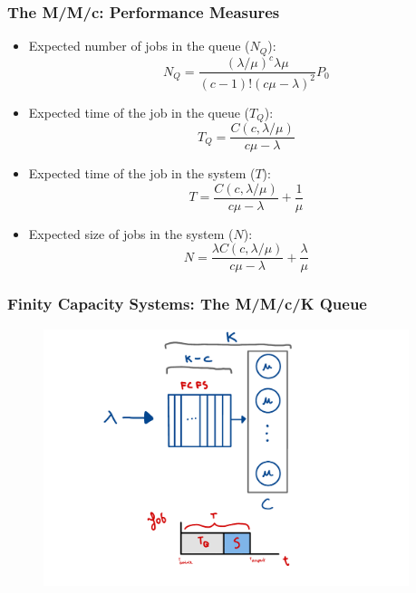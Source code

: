 \begin{frame}
    \frametitle{The M/M/c: Performance Measures}
    \begin{itemize}
        \item Expected number of jobs in the queue ($N_Q$):
        $$N_Q = \frac{(\lambda/\mu)^c\lambda\mu}{(c-1)!(c\mu - \lambda)^2}P_0$$
        \item Expected time of the job in the queue ($T_Q$):
        $$T_Q = \frac{C(c,\lambda/\mu)}{c\mu - \lambda}$$
        \item Expected time of the job in the system ($T$):
        $$T = \frac{C(c,\lambda/\mu)}{c\mu-\lambda} + \frac{1}{\mu}$$
        \item Expected size of jobs in the system ($N$):
        $$N = \frac{\lambda C(c, \lambda/\mu)}{c\mu-\lambda} + \frac{\lambda}{\mu}$$
    \end{itemize}
\end{frame}




\begin{frame}
    \frametitle{Finity Capacity Systems: The M/M/c/K Queue}
    \begin{figure}
        \centering
        \includegraphics[width=0.95\textwidth]{slides/figures/mmck_queue.pdf}
    \end{figure}
\end{frame}


